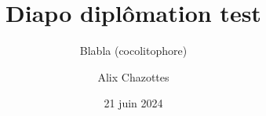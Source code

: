 \documentclass{beamer}
\title[Diapo diplômation test]{Diapo diplômation test}
\subtitle{Blabla (cocolitophore)}
\author{Alix Chazottes}
\institute{CentraleSupélec}
\date{21 juin 2024}
\begin{document}
\begin{frame}
  \titlepage
\end{frame}

%

\end{document}
